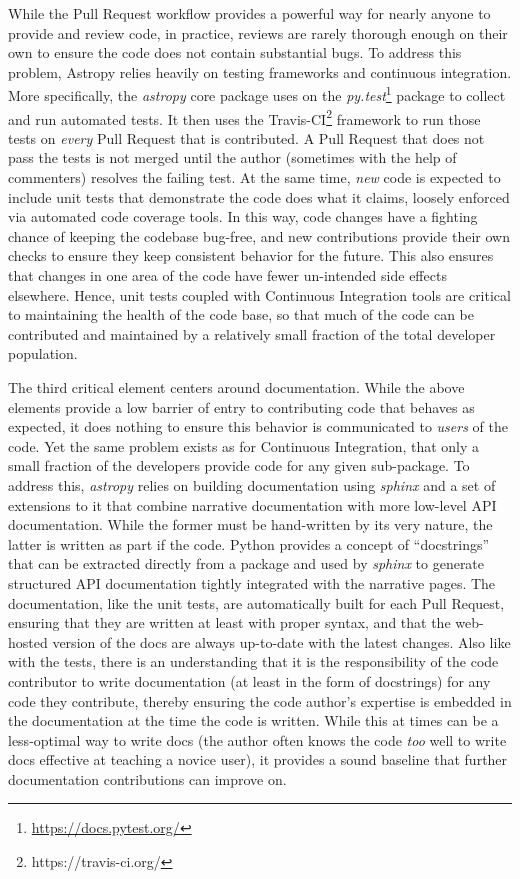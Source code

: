 \documentclass[11pt,twoside]{article}
\newcommand{\astropypkg}{\textit{astropy}}
\begin{document}
While the Pull Request workflow provides a powerful way for nearly anyone to provide and review code, in practice, reviews are rarely thorough enough on their own to ensure the code does not contain substantial bugs.
To address this problem, Astropy relies heavily on testing frameworks and continuous integration.
More specifically, the \astropypkg{} core package uses on the \textit{py.test}\footnote{\url{https://docs.pytest.org/}} package to collect and run automated tests.
It then uses the Travis-CI\footnote{https://travis-ci.org/} framework to run those tests on \emph{every} Pull Request that is contributed.
A Pull Request that does not pass the tests is not merged until the author (sometimes with the help of commenters) resolves the failing test.
At the same time, \emph{new} code is expected to include unit tests that demonstrate the code does what it claims, loosely enforced via automated code coverage tools.
In this way, code changes have a fighting chance of keeping the codebase bug-free, and new contributions provide their own checks to ensure they keep consistent behavior for the future.
This also ensures that changes in one area of the code have fewer un-intended side effects elsewhere.
Hence, unit tests coupled with Continuous Integration tools are critical to maintaining the health of the code base, so that  much of the code can be contributed and maintained by a relatively small fraction of the total developer population.

The third critical element centers around documentation.
While the above elements provide a low barrier of entry to contributing code that behaves as expected, it does nothing to ensure this behavior is communicated to \emph{users} of the code.
Yet the same problem exists as for Continuous Integration, that only a small fraction of the developers provide code for any given sub-package.
To address this, \astropypkg{} relies on building documentation using \textit{sphinx} and a set of extensions to it that  combine narrative documentation with more low-level API documentation.
While the former must be hand-written by its very nature, the latter is written as part if the code.
Python provides a concept of ``docstrings'' that can be extracted directly from a package and used by \textit{sphinx} to generate structured API documentation tightly integrated with the narrative pages.
The documentation, like the unit tests, are automatically built for each Pull Request, ensuring that they are written at least with proper syntax, and that the web-hosted version of the docs are always up-to-date with the latest changes.
Also like with the tests, there is an understanding that it is the responsibility of the code contributor to write documentation (at least in the form of docstrings) for any code they contribute, thereby ensuring the code author's expertise is embedded in the documentation at the time the code is written.
While this at times can be a less-optimal way to write docs (the author often knows the code \emph{too} well to write docs effective at teaching a novice user), it provides a sound baseline that further documentation contributions can improve on.
\end{document}
